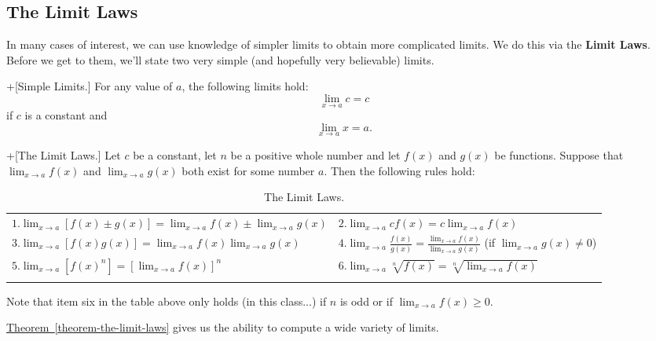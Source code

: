 \documentclass[10pt,]{book}
\newcommand{\terminology}[1]{\textbf{#1}}
\theoremstyle{ptxplainnotitle}
\theoremstyle{ptxplaintitle}
\theoremstyle{ptxplainnotitle}
\theoremstyle{ptxplaintitle}
\theoremstyle{ptxplainnotitle}
\theoremstyle{ptxplaintitle}
\theoremstyle{ptxdefinitionnotitle}
\theoremstyle{ptxdefinitiontitle}
\theoremstyle{ptxdefinitionnotitle}
\theoremstyle{ptxdefinitiontitle}
\theoremstyle{ptxdefinitionnotitle}
\theoremstyle{ptxdefinitiontitle}
\theoremstyle{ptxdefinitionnotitle}
\theoremstyle{ptxdefinitiontitle}
\theoremstyle{ptxdefinitionnotitle}
\theoremstyle{ptxdefinitiontitle}
\numberwithin{equation}{section}
\newcommand{\hrulethick} {\noalign{\hrule height 0.11em}}
\begin{document}
\subsection[{The Limit Laws}]{The Limit Laws}\label{subsection-the-limit-laws}
\hypertarget{p-20}{}%
In many cases of interest, we can use knowledge of simpler limits to obtain more complicated limits. We do this via the \terminology{Limit Laws}. Before we get to them, we'll state two very simple (and hopefully very believable) limits.%
\begin{proposition}+[{Simple Limits.}]\label{proposition-simple-limits}
\hypertarget{p-21}{}%
For any value of \(a\), the following limits hold:%
\begin{equation*}
\lim_{x\to a}c = c
\end{equation*}
if \(c\) is a constant and%
\begin{equation*}
\lim_{x\to a}x = a.
\end{equation*}
%
\end{proposition}
\begin{theorem}+[{The Limit Laws.}]\label{theorem-the-limit-laws}
\hypertarget{p-22}{}%
Let \(c\) be a constant, let \(n\) be a positive whole number and let \(f(x)\) and \(g(x)\) be functions. Suppose that \(\lim_{x\to a}f(x)\) and \(\lim_{x\to a}g(x)\) both exist for some number \(a\). Then the following rules hold:%
\begin{table}
\centering
\begin{tabular}{ll}\hrulethick
\(1. \lim_{x\to a}[f(x)\pm g(x)] = \lim_{x\to a}f(x)\pm \lim_{x\to a}g(x)\)&\(2. \lim_{x\to a}cf(x) = c\lim_{x\to a}f(x)\)\tabularnewline[0pt]
\(3. \lim_{x\to a}[f(x)g(x)] = \lim_{x\to a}f(x)\lim_{x\to a}g(x)\)&\(4. \lim_{x\to a}\frac{f(x)}{g(x)} = \frac{\lim_{x\to a}f(x)}{\lim_{x\to a}g(x)}\) (if \(\lim_{x\to a}g(x)\neq 0\))\tabularnewline[0pt]
\(5. \lim_{x\to a}[f(x)^{n}] = [\lim_{x\to a}f(x)]^{n}\)&\(6. \lim_{x\to a}\sqrt[n]{f(x)} = \sqrt[n]{\lim_{x\to a}f(x)}\)\tabularnewline\hrulethick
\end{tabular}
\caption{The Limit Laws.\label{table-limit-laws}}
\end{table}
\hypertarget{p-23}{}%
Note that item six in the table above only holds (in this class...) if \(n\) is odd or if \(\lim_{x\to a}f(x)\geq0\).%
\end{theorem}
\hypertarget{p-24}{}%
\hyperref[theorem-the-limit-laws]{Theorem~\ref{theorem-the-limit-laws}} gives us the ability to compute a wide variety of limits.%
\end{document}
